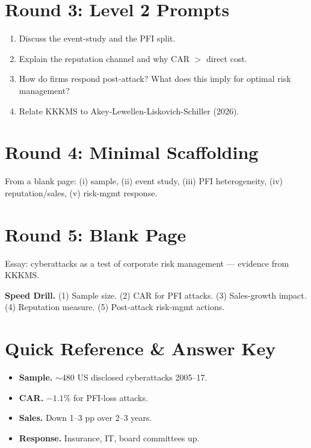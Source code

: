\documentclass[11pt]{article}
\begin{document}
\section*{Round 3: Level 2 Prompts}
\begin{enumerate}
\item Discuss the event-study and the PFI split.
\item Explain the reputation channel and why CAR $>$ direct cost.
\item How do firms respond post-attack? What does this imply for optimal risk management?
\item Relate KKKMS to Akey-Lewellen-Liskovich-Schiller (2026).
\end{enumerate}

\section*{Round 4: Minimal Scaffolding}
From a blank page: (i) sample, (ii) event study, (iii) PFI heterogeneity, (iv) reputation/sales, (v) risk-mgmt response.

\section*{Round 5: Blank Page}
Essay: cyberattacks as a test of corporate risk management --- evidence from KKKMS.

\vspace{6pt}
\begin{drillbox}
\textbf{Speed Drill.} (1) Sample size. (2) CAR for PFI attacks. (3) Sales-growth impact. (4) Reputation measure. (5) Post-attack risk-mgmt actions.
\end{drillbox}

\section*{Quick Reference \& Answer Key}
\begin{answerbox}
\begin{itemize}
\item \textbf{Sample.} $\sim$480 US disclosed cyberattacks 2005--17.
\item \textbf{CAR.} $-1.1$\% for PFI-loss attacks.
\item \textbf{Sales.} Down 1--3 pp over 2--3 years.
\item \textbf{Response.} Insurance, IT, board committees up.
\end{itemize}
\end{answerbox}
\end{document}
